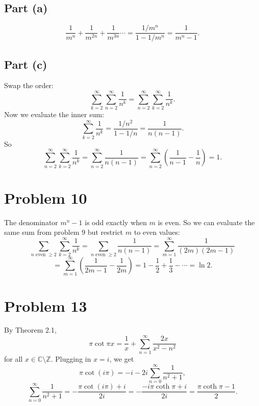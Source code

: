 \documentclass{article}
\newcommand{\bigp}[1]{\left(#1\right)}
\newcommand{\summation}[1][0]{\sum_{n=#1}^\infty}
\newcommand{\summationk}[1][0]{\sum_{k=#1}^\infty}
\newcommand{\summationm}[1][0]{\sum_{m=#1}^\infty}
\begin{document}
\subsection*{Part (a)}
$$\frac{1}{m^n} + \frac{1}{m^{2n}} + \frac{1}{m^{3n}} \cdots = \frac{1/m^n}{1 - 1/m^n} = \frac{1}{m^n - 1}.$$

\subsection*{Part (c)}
Swap the order:
$$\summationk[2]\summation[2] \frac{1}{n^k} = \summation[2]\summationk[2] \frac{1}{n^k}.$$
Now we evaluate the inner sum:
$$\summationk[2] \frac{1}{n^k} = \frac{1/n^2}{1 - 1/n} = \frac{1}{n(n - 1)}.$$
So
$$\summation[2]\summationk[2] \frac{1}{n^k} = \summation[2] \frac{1}{n(n - 1)} = \summation[2] \bigp{\frac{1}{n - 1} - \frac{1}{n}} = 1.$$

\section*{Problem 10}
The denominator $m^n - 1$ is odd exactly when $m$ is even. So we can evaluate the same sum from problem 9 but restrict $m$ to even values:
$$\sum_{n \text{ even } \ge 2}\summationk[2] \frac{1}{n^k} = \sum_{n \text{ even } \ge 2} \frac{1}{n(n - 1)} = \summationm[1] \frac{1}{(2m)(2m - 1)}$$
$$= \summationm[1] \bigp{\frac{1}{2m - 1} - \frac{1}{2m}} = 1 - \frac{1}{2} + \frac{1}{3} - \cdots = \ln 2.$$

\section*{Problem 13}
By Theorem 2.1,
$$\pi\cot \pi x = \frac{1}{x} + \summation[1]\frac{2x}{x^2 - n^2}$$
for all $x \in \mathbb{C} \setminus \mathbb{Z}$.
Plugging in $x = i$, we get
$$\pi \cot (i\pi) = -i - 2i\summation \frac{1}{n^2 + 1},$$
$$\summation \frac{1}{n^2 + 1} = - \frac{\pi\cot(i\pi) + i}{2i} = -\frac{-i\pi\coth \pi + i}{2i} = \frac{\pi\coth\pi - 1}{2}.$$
\end{document}

